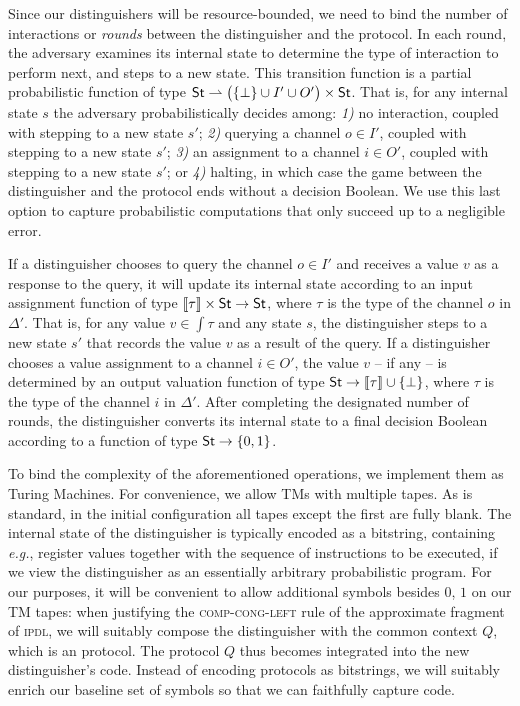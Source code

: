 Since our distinguishers will be resource-bounded, we need to bind the number of interactions or \emph{rounds} between the distinguisher and the protocol. In each round, the adversary examines its internal state to determine the type of interaction to perform next, and steps to a new state. This transition function is a partial probabilistic function of type $\mathsf{St} \rightharpoonup \big(\{\bot\} \cup I' \cup O'\big) \times \mathsf{St}$. That is, for any internal state $s$ the adversary probabilistically decides among: \emph{1)} no interaction, coupled with stepping to a new state $s'$; \emph{2)} querying a channel $o \in I'$, coupled with stepping to a new state $s'$; \emph{3)} an assignment to a channel $i \in O'$, coupled with stepping to a new state $s'$; or \emph{4)} halting, in which case the game between the distinguisher and the protocol ends without a decision Boolean. We use this last option to capture probabilistic computations that only succeed up to a negligible error.

If a distinguisher chooses to query the channel $o \in I'$ and receives a value $v$ as a response to the query, it will update its internal state according to an input assignment function of type $\llbracket \tau \rrbracket \times \mathsf{St} \to \mathsf{St}$, where $\tau$ is the type of the channel $o$ in $\Delta'$. That is, for any value $v \in \int{\tau}$ and any state $s$, the distinguisher steps to a new state $s'$ that records the value $v$ as a result of the query. If a distinguisher chooses a value assignment to a channel $i \in O'$, the value $v$ -- if any -- is determined by an output valuation function of type $\mathsf{St} \to \llbracket \tau \rrbracket \cup \{\bot\}$, where $\tau$ is the type of the channel $i$ in $\Delta'$. After completing the designated number of rounds, the distinguisher converts its internal state to a final decision Boolean according to a function of type $\mathsf{St} \to \{0,1\}$.

To bind the complexity of the aforementioned operations, we implement them as Turing Machines. For convenience, we allow TMs with multiple tapes. As is standard, in the initial configuration all tapes except the first are fully blank. The internal state of the distinguisher is typically encoded as a bitstring, containing \emph{e.g.}, register values together with the sequence of instructions to be executed, if we view the distinguisher as an essentially arbitrary probabilistic program. For our purposes, it will be convenient to allow additional symbols besides $0$, $1$ on our TM tapes: when justifying the \textsc{comp-cong-left} rule of the approximate fragment of \textsc{ipdl}, we will suitably compose the distinguisher with the common context $Q$, which is an \ipdl protocol. The protocol $Q$ thus becomes integrated into the new distinguisher's code. Instead of encoding \ipdl protocols as bitstrings, we will suitably enrich our baseline set of symbols so that we can faithfully capture \ipdl code.

